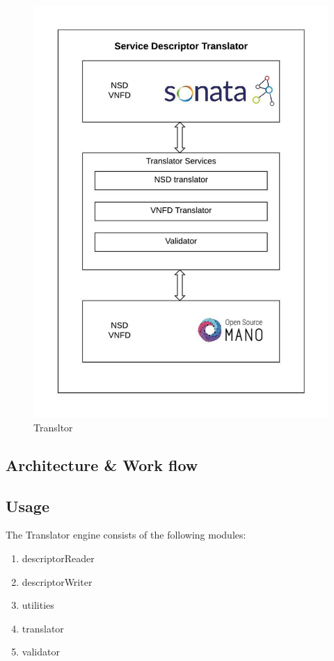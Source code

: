 \begin{figure}
	\centering
	\includegraphics[width=1\linewidth]{"figures/Service Descriptor Translator"}
	\caption{Transltor}
	\label{fig:service-descriptor-translator}
\end{figure}

\subsection{Architecture \& Work flow}
\subsection{Usage}
The Translator engine consists of the following modules:
\begin{enumerate}
	\item descriptorReader
	\item descriptorWriter
	\item utilities
	\item translator
	\item validator
	
\end{enumerate}

